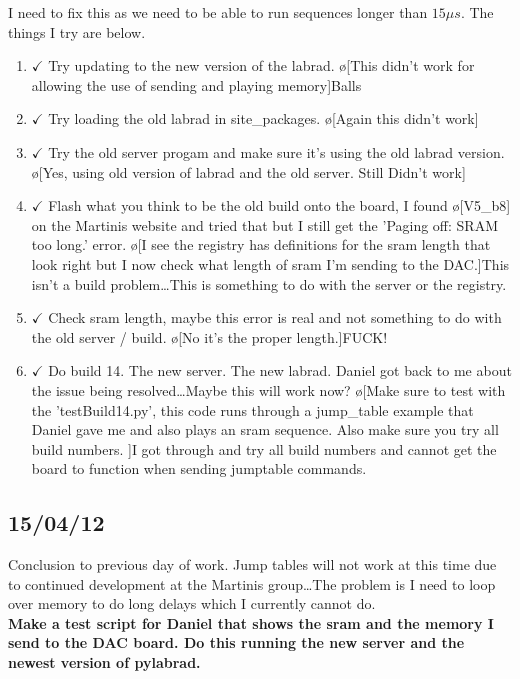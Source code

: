 \documentclass[10pt]{book}
\begin{document}
{I need to fix this as we need to be able to run sequences longer than $15 \mu s$. The things I try are below.
\begin{enumerate}
    \item $\checkmark$ Try updating to the new version of the labrad. \o[This didn't work for allowing the use of sending and playing memory]{Balls}
    \item $\checkmark$ Try loading the old labrad in site_packages. \o[Again this didn't work]{}
    \item $\checkmark$ Try the old server progam and make sure it's using the old labrad version. \o[Yes, using old version of labrad and the old server. Still Didn't work]{}
    \item $\checkmark$ Flash what you think to be the old build onto the board, I found \o[V5_b8]{} on the Martinis website and tried that but I still get the 'Paging off: SRAM too long.' error. \o[I see the registry has definitions for the sram length that look right but I now check what length of sram I'm sending to the DAC.]{This isn't a build problem\ldots This is something to do with the server or the registry.}
    \item $\checkmark$ Check sram length, maybe this error is real and not something to do with the old server / build. \o[No it's the proper length.]{FUCK!}
    \item $\checkmark$ Do build 14. The new server. The new labrad. Daniel got back to me about the issue being resolved\ldots Maybe this will work now? \o[Make sure to test with the 'testBuild14.py', this code runs through a jump\_table example that Daniel gave me and also plays an sram sequence. Also make sure you try all build numbers. ]{I got through and try all build numbers and cannot get the board to function when sending jumptable commands.}
\end{enumerate}

\subsection{15/04/12}

Conclusion to previous day of work. Jump tables will not work at this time due to continued development at the Martinis group\ldots The problem is I need to loop over memory to do long delays which I currently cannot do. \\

{\bf Make a test script for Daniel that shows the sram and the memory I send to the DAC board. Do this running the new server and the newest version of pylabrad.}


}
\end{document}
